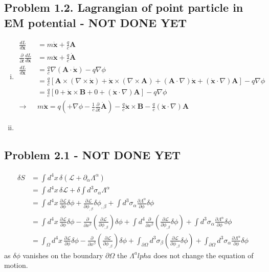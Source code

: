 \documentclass[../main.tex]{subfiles}
\begin{document}
\subsection{Problem 1.2. Lagrangian of point particle in EM potential - NOT DONE YET}
\begin{enumerate}[(i)]
\item
\begin{align}
\frac{dL}{d\dot{\mathbf{x}}}&=m\dot{\mathbf{x}}+\frac{q}{c}\mathbf{A}\\
\frac{\partial}{\partial t}\frac{dL}{d\dot{\mathbf{x}}}&=m\ddot{\mathbf{x}}+\frac{q}{c}\dot{\mathbf{A}}\\
\frac{dL}{d\mathbf{x}}&=\frac{q}{c}\nabla(\mathbf{A}\cdot\dot{\mathbf{x}})-q\nabla\phi\\
&=\frac{q}{c}\left[
\mathbf{A}\times(\nabla\times\dot{\mathbf{x}})
+\dot{\mathbf{x}}\times(\nabla\times\mathbf{A})
+(\mathbf{A}\cdot\nabla)\dot{\mathbf{x}}
+(\dot{\mathbf{x}}\cdot\nabla)\mathbf{A}
\right]
-q\nabla\phi\\
&=\frac{q}{c}\left[
0
+\dot{\mathbf{x}}\times\mathbf{B}
+0
+(\dot{\mathbf{x}}\cdot\nabla)\mathbf{A}
\right]
-q\nabla\phi\\
\rightarrow&m\ddot{\mathbf{x}}=q\left(+\nabla\phi-\frac{1}{c}\frac{\partial}{\partial t}\dot{\mathbf{A}}\right)
-\frac{q}{c}\dot{\mathbf{x}}\times\mathbf{B}
-\frac{q}{c}(\dot{\mathbf{x}}\cdot\nabla)\mathbf{A}
\end{align}
\item
\end{enumerate}




\subsection{Problem 2.1 - NOT DONE YET}
\begin{align}
\delta S
&=\int d^4x\,\delta(\mathcal{L}+\partial_\alpha\Lambda^\alpha)\\
&=\int d^4x\,\delta\mathcal{L}+\delta\int d^3\sigma_\alpha\Lambda^\alpha\\
&=\int d^4x\,\frac{\partial\mathcal{L}}{\partial\phi}\delta\phi+\frac{\partial\mathcal{L}}{\partial\phi_{,\beta}}\delta\phi_{,\beta}+\int d^3\sigma_\alpha\frac{\partial\Lambda^\alpha}{\partial\phi}\delta\phi\\
&=\int d^4x\,\frac{\partial\mathcal{L}}{\partial\phi}\delta\phi-\frac{\partial}{\partial x^\beta}\left(\frac{\partial\mathcal{L}}{\partial\phi_{,\beta}}\right)\delta\phi+\int d^4\frac{\partial}{\partial x^\beta}\left(\frac{\partial\mathcal{L}}{\partial\phi_{,\beta}}\delta\phi\right)+\int d^3\sigma_\alpha\frac{\partial\Lambda^\alpha}{\partial\phi}\delta\phi\\
&=\int_\Omega d^4x\,\frac{\partial\mathcal{L}}{\partial\phi}\delta\phi-\frac{\partial}{\partial x^\beta}\left(\frac{\partial\mathcal{L}}{\partial\phi_{,\beta}}\right)\delta\phi+\int_{\partial\Omega} d^3\sigma_\beta\left(\frac{\partial\mathcal{L}}{\partial\phi_{,\beta}}\delta\phi\right)+\int_{\partial\Omega} d^3\sigma_\alpha\frac{\partial\Lambda^\alpha}{\partial\phi}\delta\phi
\end{align}
as $\delta\phi$ vanishes on the boundary $\partial\Omega$ the $\Lambda^alpha$ does not change the equation of motion.
\end{document}
